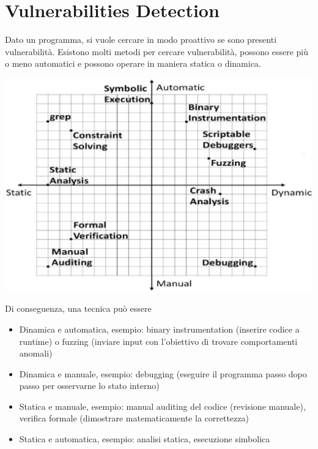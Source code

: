 
\section{Vulnerabilities Detection}

Dato un programma, si vuole cercare in modo proattivo se sono presenti vulnerabilità. Esistono molti metodi per cercare vulnerabilità, possono essere più o meno automatici e possono operare in maniera statica o dinamica.
\begin{center}
	\includegraphics[width=0.7\linewidth]{img/vulnerabilities/manaut}
\end{center}

Di conseguenza, una tecnica può essere
\begin{itemize}
	\item Dinamica e automatica, esempio: binary instrumentation (inserire codice a runtime) o fuzzing (inviare input con l'obiettivo di trovare comportamenti anomali)
    
	\item Dinamica e manuale, esempio: debugging (eseguire il programma passo dopo passo per osservarne lo stato interno)
    
	\item Statica e manuale, esempio: manual auditing del codice (revisione manuale), verifica formale (dimostrare matematicamente la correttezza)
    
	\item Statica e automatica, esempio: analisi statica, esecuzione simbolica
\end{itemize}

